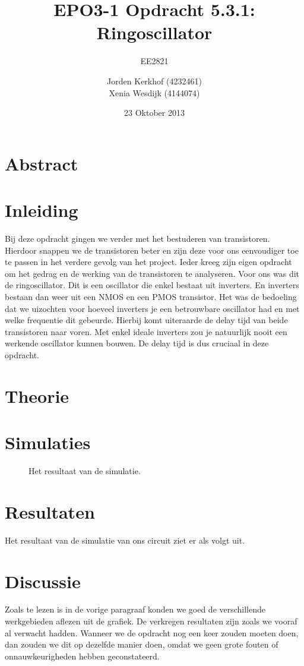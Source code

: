 \documentclass{scrartcl}  %
\author{Jorden {Kerkhof} (4232461)  \\{Xenia Wesdijk} (4144074)}
\title{EPO3-1   Opdracht 5.3.1: Ringoscillator}
\subtitle{EE2821}
\date{23 Oktober 2013}
\begin{document}
\maketitle
\vspace{80 mm}
\section*{Abstract}

\newpage
\setlength{\cftbeforetoctitleskip}{-3em}
\tableofcontents
\newpage
{}
\section{Inleiding}
Bij deze opdracht gingen we verder met het bestuderen van transistoren. Hierdoor snappen we de transistoren beter en zijn deze voor ons eenvoudiger toe te passen in het verdere gevolg van het project. Ieder kreeg zijn eigen opdracht om het gedrag en de werking van de transistoren te analyseren. Voor ons was dit de ringoscillator. Dit is een oscillator die enkel bestaat uit inverters. En inverters bestaan dan weer uit een NMOS en een PMOS transistor. Het was de bedoeling dat we uizochten voor hoeveel inverters je een betrouwbare oscillator had en met welke frequentie dit gebeurde. Hierbij komt uiteraarde de delay tijd van beide transistoren naar voren. Met enkel ideale inverters zou je natuurlijk nooit een werkende oscillator kunnen bouwen. De delay tijd is dus cruciaal in deze opdracht.  

\section{Theorie}

\section{Simulaties}
\begin{figure}[H]
\centering
	\setlength{} 
	\setlength{}
	
	\caption{Het resultaat van de simulatie.}
	\label{fig:Id}
\end{figure}
\section{Resultaten}
Het resultaat van de simulatie van ons circuit ziet er als volgt uit.
\section{Discussie}
Zoals te lezen is in de vorige paragraaf konden we goed de verschillende werkgebieden aflezen uit de grafiek. 
De verkregen resultaten zijn zoals we vooraf al verwacht hadden. 
Wanneer we de opdracht nog een keer zouden moeten doen, dan zouden we dit op dezelfde manier doen, omdat we geen grote fouten of onnauwkeurigheden hebben geconstateerd. 
\end{document}
